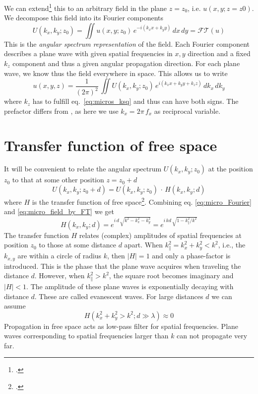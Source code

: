 We can extend\footcite[chapter 2.12]{Novotny-Hecht2012} this to an arbitrary field in the plane $z=z_0$, i.e. $u(x,y; z=z0)$. We decompose this field into its Fourier components
\begin{equation}
    U(k_x, k_y; z_0) = \iint u(x,y; z_0) \,  e^{-i (k_x x + k_y y )} \, dx \, dy = \mathcal{FT} ( u ) \label{eq:micro_Fourier}
\end{equation}
This is the \emph{angular spectrum representation} of the field. Each Fourier component describes a plane wave with  given spatial frequencies in $x,y$ direction and a fixed $k_z$ component and thus a given angular propagation direction. For each plane wave, we know thus the field everywhere in space. This allows us to write
\begin{equation}
    u(x,y,z) = \frac{1}{(2 \pi)^2} \, \iint U(k_x, k_y; z_0) \,  e^{i (k_x x + k_y y + k_z z)} \, dk_x \, dk_y \label{eq:micro_field_by_FT}
\end{equation}
where $k_z$ has to fulfill eq.~\ref{eq:micros_ksq} and thus can have both signs. The prefactor differs from \cite{Goodman2005}, as here we use $k_x = 2 \pi \, f_x$ as reciprocal variable. 


\section{Transfer function of free space}

It will be convenient to relate the angular spectrum $U(k_x, k_y; z_0)$ at the position $z_0$ to that at some other position $z = z_0 + d$
\begin{equation}
    U(k_x, k_y; z_0 + d) =   U(k_x, k_y; z_0) \, \cdot \,  H(k_x, k_y; d)
\end{equation}
where $H$ is the transfer function of free space\footcite[chapter 4.1.B]{SalehTeich1991}. Combining eq.  \ref{eq:micro_Fourier} and \ref{eq:micro_field_by_FT} we get
\begin{equation}
    H(k_x, k_y; d) = e^{i \, d \, \sqrt{k^2 - k_x^2 - k_y^2}}
    =  e^{i \, k d \, \sqrt{1 - k_\parallel^2/k^2 }}
\end{equation}
The transfer function $H$ relates (complex) amplitudes of spatial frequencies at position $z_0$ to those at some distance $d$ apart. When $ k_\parallel^2 = k_x^2 + k_y^2 < k^2$, i.e., the $k_{x,y}$ are within a circle of radius $k$, then $|H| = 1$ and only a phase-factor is introduced. This is the phase that the plane wave acquires when traveling the distance $d$. However, when $k_\parallel^2  > k^2$,  the square root becomes imaginary and $|H| < 1$. The amplitude of these plane waves is exponentially decaying with distance $d$. These are called evanescent waves. For large distances $d$ we can assume
\begin{equation}
    H(k_x^2 + k_y^2 > k^2; d \gg \lambda) \approx 0
\end{equation}
Propagation in free space acts as low-pass filter for spatial frequencies. Plane waves corresponding to spatial frequencies larger than $k$ can not propagate very far.

